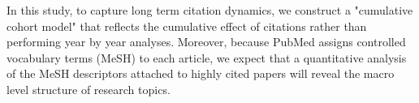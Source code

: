 In this study, to capture long term citation dynamics, we construct a "cumulative cohort model" that reflects the cumulative effect of citations rather than performing year by year analyses. Moreover, because PubMed assigns controlled vocabulary terms (MeSH) to each article, we expect that a quantitative analysis of the MeSH descriptors attached to highly cited papers will reveal the macro level structure of research topics.
